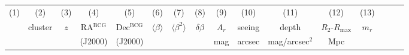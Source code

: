 \documentclass[useAMS,usenatbib]{mnras}
\begin{document}







\begin{table}
\begin{tabular*}{1.0\textwidth}{ l l c c c r c c c c c c c c l l }
\multicolumn{1}{c}{(1) } & \multicolumn{1}{c}{ (2) } & \multicolumn{1}{c}{ (3) } & \multicolumn{1}{c}{ (4) } & \multicolumn{1}{c}{ (5) } &  \multicolumn{1}{c}{ (6) } & \multicolumn{1}{c}{ (7) } & \multicolumn{1}{c}{ (8) } &  \multicolumn{1}{c}{ (9) } & \multicolumn{1}{c}{ (10) } & \multicolumn{1}{c}{ (11) } & \multicolumn{1}{c}{ (12) } & \multicolumn{1}{c}{ (13) } \\

\multicolumn{1}{c}{ } & \multicolumn{1}{c}{ cluster} & \multicolumn{1}{c}{ $z$} &  \multicolumn{1}{c}{ RA$^{\mathrm{BCG}}$} & \multicolumn{1}{c}{ Dec$^{\mathrm{BCG}}$} & \multicolumn{1}{c}{ $\langle \beta \rangle$} &  \multicolumn{1}{c}{ $\langle \beta^2 \rangle$} & \multicolumn{1}{c}{ $\delta \beta$} & \multicolumn{1}{c}{ $A_r$} & \multicolumn{1}{c}{seeing}  & \multicolumn{1}{c}{ depth} & \multicolumn{1}{c}{$R_2$-$R_\mathrm{max}$} & \multicolumn{1}{c}{ $m_r$ }\\
 &  & & (J2000) & \multicolumn{1}{c}{(J2000)}  &  &  &  &  mag & arcsec & mag/arcsec$^2$ & Mpc & \\
 

\end{tabular*}
\end{table}
\end{document}
